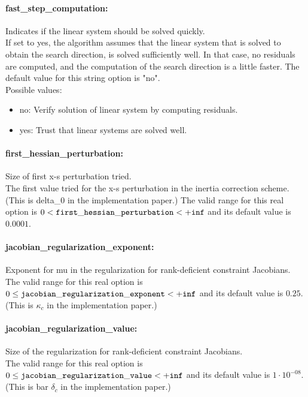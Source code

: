 \paragraph{fast\_step\_computation:}\label{sec:fast_step_computation} Indicates if the linear system should be solved quickly. $\;$ \\
 If set to yes, the algorithm assumes that the
linear system that is solved to obtain the search
direction, is solved sufficiently well. In that
case, no residuals are computed, and the
computation of the search direction is a little
faster.
The default value for this string option is "no".
\\ 
Possible values:
\begin{itemize}
   \item no: Verify solution of linear system by computing
residuals.
   \item yes: Trust that linear systems are solved well.
\end{itemize}

\paragraph{first\_hessian\_perturbation:}\label{sec:first_hessian_perturbation} Size of first x-s perturbation tried. $\;$ \\
 The first value tried for the x-s perturbation in
the inertia correction scheme.(This is delta\_0
in the implementation paper.) The valid range for this real option is 
$0 <  {\tt first\_hessian\_perturbation } <  {\tt +inf}$
and its default value is $0.0001$.


\paragraph{jacobian\_regularization\_exponent:}\label{sec:jacobian_regularization_exponent} Exponent for mu in the regularization for rank-deficient constraint Jacobians. $\;$ \\
  The valid range for this real option is 
$0 \le {\tt jacobian\_regularization\_exponent } <  {\tt +inf}$
and its default value is $0.25$.
(This is $\kappa_c$ in the implementation paper.)


\paragraph{jacobian\_regularization\_value:}\label{sec:jacobian_regularization_value} Size of the regularization for rank-deficient constraint Jacobians. $\;$ \\
The valid range for this real option is 
$0 \le {\tt jacobian\_regularization\_value } <  {\tt +inf}$
and its default value is $1 \cdot 10^{-08}$.
(This is bar $\delta_c$ in the implementation paper.)



